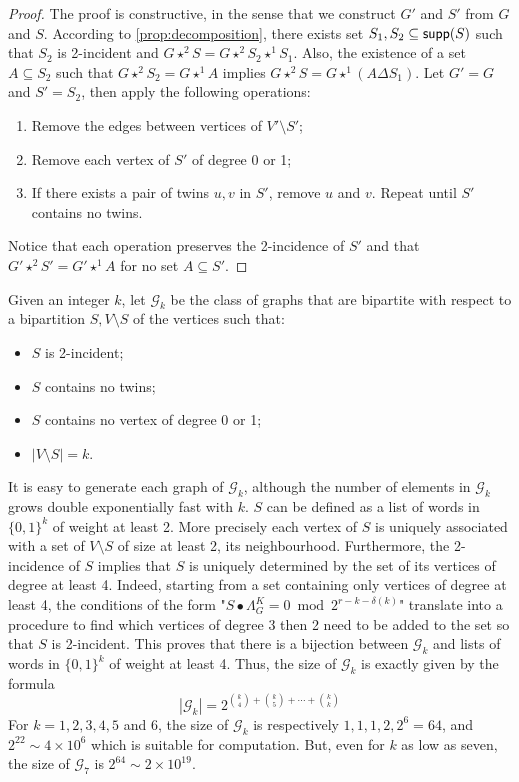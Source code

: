\documentclass[a4paper,UKenglish,cleveref,autoref,thm-restate]{arxiv}
\newcommand{\se}{\subseteq}
\newcommand{\sm}{\setminus}
\newcommand{\supp}{\textup{\textsf{supp}}}
\begin{document}
\begin{proof}
    The proof is constructive, in the sense that we construct $G'$ and $S'$ from $G$ and $S$. According to \cref{prop:decomposition}, there exists set $S_1, S_2 \se \supp(S)$ such that $S_2$ is 2-incident and $G \star^2 S = G \star^2 S_2 \star^1 S_1$. Also, the existence of a set $A \se S_2$ such that $G \star^2 S_2 = G \star^1 A$ implies $G \star^2 S = G \star^1 (A \Delta S_1)$. Let $G' = G$ and $S' = S_2$, then apply the following operations:
    \begin{enumerate}
        \item Remove the edges between vertices of $V' \sm S'$;
\item Remove each vertex of $S'$ of degree 0 or 1;
        \item If there exists a pair of twins $u,v$ in $S'$, remove $u$ and $v$. Repeat until $S'$ contains no twins.
    \end{enumerate}
    Notice that each operation preserves the 2-incidence of $S'$ and that  $G' \star^2 S' = G' \star^1 A$ for no set $A \se S'$.
\end{proof}

Given an integer $k$, let $\mathcal G_k$ be the class of graphs that are bipartite with respect to a bipartition $S, V \sm S$ of the vertices such that:
\begin{itemize}
    \item $S$ is 2-incident;
    \item $S$ contains no twins;
    \item $S$ contains no vertex of degree 0 or 1;
    \item $|V \sm S| = k$.
\end{itemize}
It is easy to generate each graph of $\mathcal G_k$, although the number of elements in $\mathcal G_k$ grows double exponentially fast with $k$. $S$ can be defined as a list of words in $\{0,1\}^k$ of weight at least 2. More precisely each vertex of $S$ is uniquely associated with a set of $V \sm S$ of size at least 2, its neighbourhood. Furthermore, the 2-incidence of $S$ implies that $S$ is uniquely determined by the set of its vertices of degree at least 4. Indeed, starting from a set containing only vertices of degree at least 4, the conditions of the form "$S\bullet \Lambda_G^K = 0 \bmod 2^{r-k-\delta(k)}$" translate into a procedure to find which vertices of degree 3 then 2 need to be added to the set so that $S$ is 2-incident. This proves that there is a bijection between $\mathcal G_k$ and lists of words in $\{0,1\}^k$ of weight at least 4. Thus, the size of $\mathcal G_k$ is exactly given by the formula $$ |\mathcal G_k| = 2^{\binom{k}{4} + \binom{k}{5} + \cdots + \binom{k}{k}}$$
For $k=1,2,3,4,5$ and $6$, the size of $\mathcal G_k$ is respectively $1,1,1,2,2^6 = 64$, and $2^{22} \sim 4 \times 10^6$ which is suitable for computation. But, even for $k$ as low as seven, the size of $\mathcal G_7$ is $2^{64} \sim 2 \times 10^{19}$.
\end{document}
